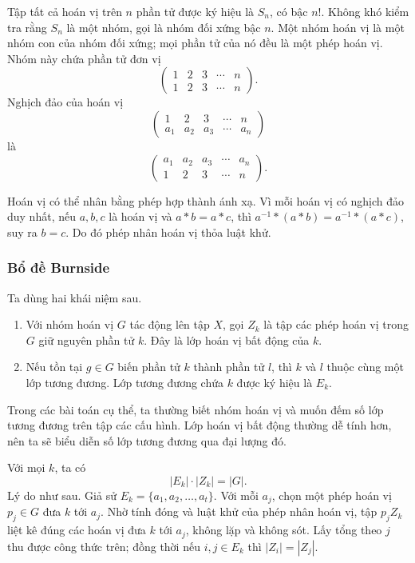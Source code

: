 \documentclass[11pt]{article}
\begin{document}
Tập tất cả hoán vị trên \(n\) phần tử được ký hiệu là \(S_n\), có bậc \(n!\).
Không khó kiểm tra rằng \(S_n\) là một nhóm, gọi là nhóm đối xứng bậc \(n\).
Một nhóm hoán vị là một nhóm con của nhóm đối xứng; mọi phần tử của nó đều là
một phép hoán vị. Nhóm này chứa phần tử đơn vị
\[
  \begin{pmatrix}
    1 & 2 & 3 & \cdots & n\\
    1 & 2 & 3 & \cdots & n
  \end{pmatrix}.
\]
Nghịch đảo của hoán vị
\[
  \begin{pmatrix}
    1 & 2 & 3 & \cdots & n\\
    a_1 & a_2 & a_3 & \cdots & a_n
  \end{pmatrix}
\]
là
\[
  \begin{pmatrix}
    a_1 & a_2 & a_3 & \cdots & a_n\\
    1 & 2 & 3 & \cdots & n
  \end{pmatrix}.
\]

Hoán vị có thể nhân bằng phép hợp thành ánh xạ. Vì mỗi hoán vị có nghịch đảo
duy nhất, nếu \(a,b,c\) là hoán vị và \(a*b=a*c\), thì
\(a^{-1}*(a*b)=a^{-1}*(a*c)\), suy ra \(b=c\). Do đó phép nhân hoán vị thỏa
luật khử.

\subsubsection{Bổ đề Burnside}

Ta dùng hai khái niệm sau.
\begin{enumerate}
  \item Với nhóm hoán vị \(G\) tác động lên tập \(X\), gọi \(Z_k\) là tập các
  phép hoán vị trong \(G\) giữ nguyên phần tử \(k\). Đây là lớp hoán vị bất
  động của \(k\).
  \item Nếu tồn tại \(g\in G\) biến phần tử \(k\) thành phần tử \(l\), thì
  \(k\) và \(l\) thuộc cùng một lớp tương đương. Lớp tương đương chứa \(k\)
  được ký hiệu là \(E_k\).
\end{enumerate}

Trong các bài toán cụ thể, ta thường biết nhóm hoán vị và muốn đếm số lớp
tương đương trên tập các cấu hình. Lớp hoán vị bất động thường dễ tính hơn,
nên ta sẽ biểu diễn số lớp tương đương qua đại lượng đó.

Với mọi \(k\), ta có
\[
  |E_k|\cdot |Z_k|=|G|.
\]
Lý do như sau. Giả sử \(E_k=\{a_1,a_2,\ldots,a_t\}\). Với mỗi \(a_j\), chọn
một phép hoán vị \(p_j\in G\) đưa \(k\) tới \(a_j\). Nhờ tính đóng và luật khử
của phép nhân hoán vị, tập \(p_jZ_k\) liệt kê đúng các hoán vị đưa \(k\) tới
\(a_j\), không lặp và không sót. Lấy tổng theo \(j\) thu được công thức trên;
đồng thời nếu \(i,j\in E_k\) thì \(|Z_i|=|Z_j|\).
\end{document}
